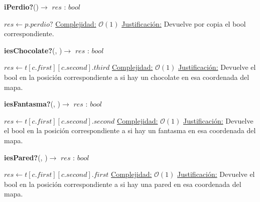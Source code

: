 \documentclass[10pt, a4paper]{article}
\begin{document}
\begin{Algoritmos}
    \begin{algorithm}{\textbf{iPerdio?}()$\to$ $res$ : $bool$}
        \begin{algorithmic}
            \State $res \gets p.perdio?$
            \Statex \underline{Complejidad:} $\mathcal{O}(1)$
            \Statex \underline{Justificación:} Devuelve por copia el bool correspondiente.
        \end{algorithmic}
    \end{algorithm}
    
    \begin{algorithm}{\textbf{iesChocolate?}(, )$\to$ $res$ : $bool$}
        \begin{algorithmic}
            \State $res \gets t[c.first][c.second].third$
            \Statex \underline{Complejidad:} $\mathcal{O}(1)$
            \Statex \underline{Justificación:} Devuelve el bool en la posición correspondiente a si hay un chocolate en esa coordenada del mapa.
        \end{algorithmic}
    \end{algorithm}
    
    \begin{algorithm}{\textbf{iesFantasma?}(, )$\to$ $res$ : $bool$}
        \begin{algorithmic}
            \State $res \gets t[c.first][c.second].second$
            \Statex \underline{Complejidad:} $\mathcal{O}(1)$
            \Statex \underline{Justificación:} Devuelve el bool en la posición correspondiente a si hay un fantasma en esa coordenada del mapa.
        \end{algorithmic}
    \end{algorithm}
    
    \begin{algorithm}{\textbf{iesPared?}(, )$\to$ $res$ : $bool$}
        \begin{algorithmic}
            \State $res \gets t[c.first][c.second].first$
            \Statex \underline{Complejidad:} $\mathcal{O}(1)$
            \Statex \underline{Justificación:} Devuelve el bool en la posición correspondiente a si hay una pared en esa coordenada del mapa.
        \end{algorithmic}
    \end{algorithm}
    

\end{Algoritmos}
\end{document}
